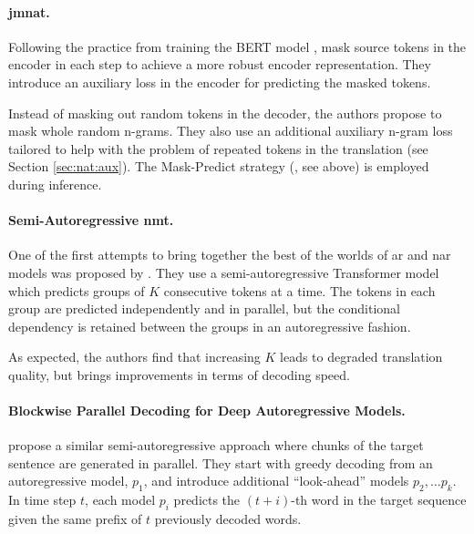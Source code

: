 \paragraph{\Acl{jmnat}.} Following the practice from training
the BERT model \citep{devlin-etal-2019-bert}, \citet{guo-etal-2020-jointly}
mask source tokens in the encoder in each step to achieve a more robust encoder
representation. They introduce an auxiliary loss in the encoder for predicting
the masked tokens.

Instead of masking out random tokens in the decoder, the authors propose to
mask whole random n-grams. They also use an additional auxiliary n-gram loss
tailored to help with the problem of repeated tokens in the translation (see
Section \ref{sec:nat:aux}). The Mask-Predict strategy
(\citealp{ghazvininejad-etal-2019-mask}, see above) is employed during
inference.

\paragraph{Semi-Autoregressive \acs{nmt}.} One of the first attempts to bring
together the best of the worlds of \ac{ar} and \ac{nar} models was proposed by
\citet{wang-etal-2018-semi}. They use a semi-autoregressive Transformer model
which predicts groups of $K$ consecutive tokens at a time. The tokens in each
group are predicted independently and in parallel, but the conditional
dependency is retained between the groups in an autoregressive fashion.

As expected, the authors find that increasing $K$ leads to degraded translation
quality, but brings improvements in terms of decoding speed.

\paragraph{Blockwise Parallel Decoding for Deep Autoregressive Models.}
\citet{stern2018blockwise} propose a similar semi-autoregressive approach where
chunks of the target sentence are generated in parallel.
%
They start with greedy decoding from an autoregressive model, $p_1$, and
introduce additional ``look-ahead'' models $p_2, \ldots p_k$. In time step $t$,
each model $p_i$ predicts the $(t + i)$-th word in the target sequence given
the same prefix of $t$ previously decoded words.

